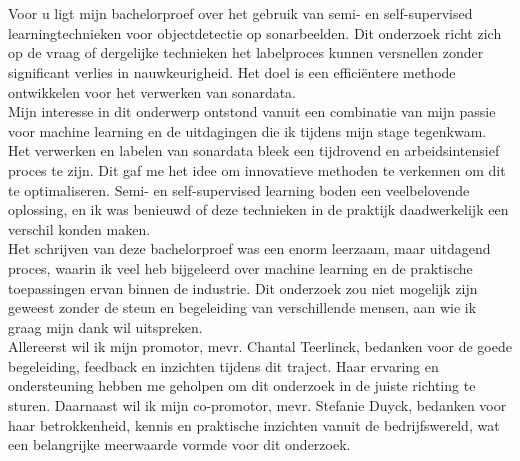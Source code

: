 
\chapter*{}%
\label{ch:voorwoord}


Voor u ligt mijn bachelorproef over het gebruik van semi- en self-supervised learningtechnieken voor objectdetectie op sonarbeelden. Dit onderzoek richt zich op de vraag of dergelijke technieken het labelproces kunnen versnellen zonder significant verlies in nauwkeurigheid. Het doel is een efficiëntere methode ontwikkelen voor het verwerken van sonardata. \\

Mijn interesse in dit onderwerp ontstond vanuit een combinatie van mijn passie voor machine learning en de uitdagingen die ik tijdens mijn stage tegenkwam. Het verwerken en labelen van sonardata bleek een tijdrovend en arbeidsintensief proces te zijn. Dit gaf me het idee om innovatieve methoden te verkennen om dit te optimaliseren. Semi- en self-supervised learning boden een veelbelovende oplossing, en ik was benieuwd of deze technieken in de praktijk daadwerkelijk een verschil konden maken. \\

Het schrijven van deze bachelorproef was een enorm leerzaam, maar uitdagend proces, waarin ik veel heb bijgeleerd over machine learning en de praktische toepassingen ervan binnen de industrie. Dit onderzoek zou niet mogelijk zijn geweest zonder de steun en begeleiding van verschillende mensen, aan wie ik graag mijn dank wil uitspreken. \\

Allereerst wil ik mijn promotor, mevr. Chantal Teerlinck, bedanken voor de goede begeleiding, feedback en inzichten tijdens dit traject. Haar ervaring en ondersteuning hebben me geholpen om dit onderzoek in de juiste richting te sturen. Daarnaast wil ik mijn co-promotor, mevr. Stefanie Duyck, bedanken voor haar betrokkenheid, kennis en praktische inzichten vanuit de bedrijfswereld, wat een belangrijke meerwaarde vormde voor dit onderzoek. \\

